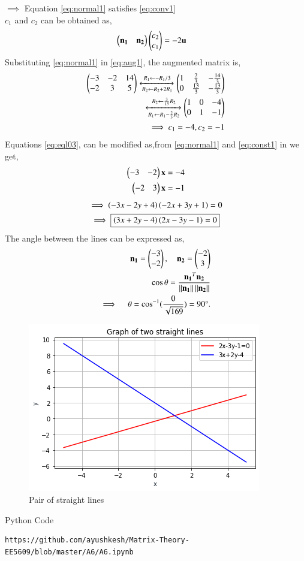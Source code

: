 \documentclass[journal,12pt,twocolumn]{IEEEtran}
\begin{document}
$\implies$ Equation \eqref{eq:normal1} satisfies \eqref{eq:conv1}\\
$c_1$ and $c_2$ can be obtained as,
\begin{align}
\begin{pmatrix}\mathbf{n_1} & \mathbf{n_2}\end{pmatrix}\begin{pmatrix}c_2\\c_1\end{pmatrix}&=-2\mathbf{u} \label{eq:aug1}
\end{align}
Substituting \eqref{eq:normal1} in \eqref{eq:aug1}, the augmented matrix is,
\begin{align}
\begin{pmatrix}-3 & -2 & 14 \\ -2 & 3 & 5\end{pmatrix}
\xleftrightarrow[R_2\leftarrow R_2+2R_1]{R_1\leftarrow -R_1/3}
\begin{pmatrix}1 &\frac{2}{3} &-\frac{14}{3} \\ 0& \frac{13}{3} & -\frac{13}{3}\end{pmatrix} \label{eq:aug5}\\
\xleftrightarrow[R_1\leftarrow R_1-\frac{2}{3}R_2]{R_2\leftarrow \frac{3}{13}R_2}
\begin{pmatrix}1 &0 &-4 \\ 0& 1 & -1\end{pmatrix} \label{eq:aug2}\\
\implies c_1 = -4, c_2=-1 \label{eq:const1}
\end{align}
Equations \eqref{eq:eql03}, can be modified as,from \eqref{eq:normal1} and \eqref{eq:const1} in we get,
\begin{align}
    \begin{pmatrix}-3 & -2\end{pmatrix}\mathbf{x}&=-4\\
    \begin{pmatrix}-2 & 3\end{pmatrix}\mathbf{x}&=-1
\end{align}
\begin{multline}
\implies \left(-3x-2y+4\right)\left(-2x+3y+1\right)= 0\\
\implies \boxed{\left(3x+2y-4\right)\left(2x-3y-1\right) = 0} \label{eq:line1}
\end{multline}
The angle between the lines can be expressed as, 
\begin{align}
	\mathbf{n_1}=\begin{pmatrix}-3\\-2\end{pmatrix} , \quad \mathbf{n_2}=\begin{pmatrix}-2\\3\end{pmatrix}\\
	\cos\theta=\frac{\mathbf{n_1}^T\mathbf{n_2}}{\left\lVert\mathbf{n_1}\right\rVert\left\lVert\mathbf{n_2}\right\rVert} \\
	\implies \quad \theta=\cos^{-1}({\frac{0}{\sqrt{169}}}) = 90\degree.
\end{align}
\renewcommand{\thefigure}{1}
\begin{figure}[h]
    \centering
    \includegraphics[width=\columnwidth]{A6.png}
    \caption{Pair of straight lines}
    \label{Fig :1}
\end{figure}
Python Code 
\begin{lstlisting}
https://github.com/ayushkesh/Matrix-Theory-EE5609/blob/master/A6/A6.ipynb
\end{lstlisting}
\end{document}
